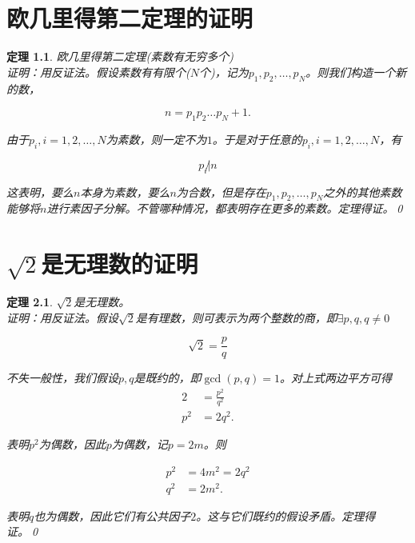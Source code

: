 \appendix
\newtheorem{theorem}{定理}

\chapter{欧几里得第二定理的证明}
\label{appendix:apps}

	\begin{theorem}
		欧几里得第二定理(素数有无穷多个)\\
		证明：用反证法。假设素数有有限个($N$个)，记为$p_1,p_2,\dots,p_N$。则我们构造一个新的数，
		
		\[n=p_1p_2\dots p_N+1.\]
		
		由于$p_i,i=1,2,\dots,N$为素数，则一定不为$1$。于是对于任意的$p_i,i=1,2,\dots, N$，有
		
		\[p_i\not|n\]
		
		这表明，要么$n$本身为素数，要么$n$为合数，但是存在$p_1,p_2,\dots,p_N$之外的其他素数能够将$n$进行素因子分解。不管哪种情况，都表明存在更多的素数。定理得证。\qed
	\end{theorem}

\chapter{$\sqrt{2}$是无理数的证明}
	\begin{theorem}
		$\sqrt{2}$是无理数。\\
		证明：用反证法。假设$\sqrt{2}$是有理数，则可表示为两个整数的商，即$\exists p,q, q\ne0$
		
		\[\sqrt{2}=\frac{p}{q}\]
		
		不失一般性，我们假设$p,q$是既约的，即$\gcd(p,q)=1$。对上式两边平方可得\\
		
		\begin{align*}
			2& =\frac{p^2}{q^2}\\
			p^2&=2q^2.
		\end{align*}
		
		表明$p^2$为偶数，因此$p$为偶数，记$p=2m$。则
		
		\begin{align*}
			p^2&=4m^2=2q^2\\
			q^2&=2m^2.
		\end{align*}
		
		表明$q$也为偶数，因此它们有公共因子$2$。这与它们既约的假设矛盾。定理得证。\qed
	\end{theorem} 